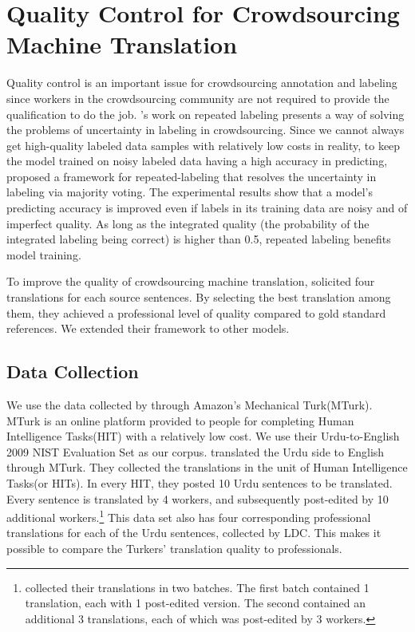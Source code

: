 \onehalfspaced
\chapter{Quality Control for Crowdsourcing Machine Translation}
Quality control is an important issue for crowdsourcing annotation and labeling since workers in the crowdsourcing community are not required to provide the qualification to do the job. 's work on repeated labeling presents a way of solving the problems of uncertainty in labeling in crowdsourcing. Since we cannot always get high-quality labeled data samples with relatively low costs in reality, to keep the model trained on noisy labeled data having a high accuracy in predicting,  proposed a framework for repeated-labeling that resolves the uncertainty in labeling via majority voting. The experimental results show that a model's predicting accuracy is improved even if labels in its training data are noisy and of imperfect quality.  As long as the integrated quality (the probability of the integrated labeling being correct) is higher than 0.5, repeated labeling benefits model training. 

To improve the quality of crowdsourcing machine translation, \cite{zaidan-callisonburch:2011:ACL-HLT2011a}  solicited four translations for each source sentences. By selecting the best translation among them, they achieved a professional level of quality compared to gold standard references. We extended their framework to other models.

\section{Data Collection}

We use the data collected by   through Amazon's Mechanical Turk(MTurk). MTurk is an online platform provided to people for completing Human Intelligence Tasks(HIT) with a relatively low cost. We use their Urdu-to-English 2009 NIST Evaluation Set as our corpus.    translated the Urdu side to English through MTurk. They collected the translations in the unit of Human Intelligence Tasks(or HITs). In every HIT, they posted 10 Urdu sentences to be translated. Every sentence is translated by 4 workers, and subsequently post-edited by 10 additional workers.\footnote{  collected their translations in two batches.  The first batch contained 1 translation, each with 1 post-edited  version.  The second contained an additional 3 translations, each of which was post-edited by 3 workers.}
This data set also has four corresponding professional translations for each  of the Urdu sentences, collected by LDC. This makes it possible to compare the Turkers' translation quality to professionals.  
